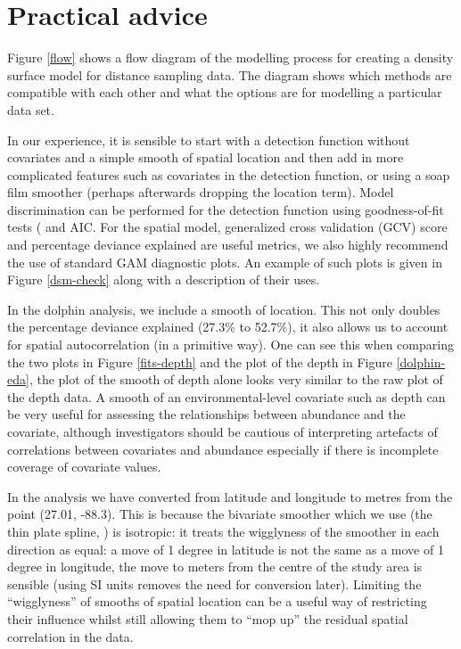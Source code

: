 \documentclass[a4paper,12pt]{article}
\begin{document}
\section*{Practical advice}
\label{s:practical}

Figure \ref{flow} shows a flow diagram of the modelling process for creating a density surface model for distance sampling data. The diagram shows which methods are compatible with each other and what the options are for modelling a particular data set.

In our experience, it is sensible to start with a detection function without covariates and a simple smooth of spatial location and then add in more complicated features such as covariates in the detection function, or using a soap film smoother (perhaps afterwards dropping the location term). Model discrimination can be performed for the detection function using goodness-of-fit tests (\cite{Buckland:2004ts} and AIC. For the spatial model, generalized cross validation (GCV) score and percentage deviance explained are useful metrics, we also highly recommend the use of standard GAM diagnostic plots. An example of such plots is given in Figure \ref{dsm-check} along with a description of their uses.

In the dolphin analysis, we include a smooth of location. This not only doubles the percentage deviance explained (27.3\% to 52.7\%), it also allows us to account for spatial autocorrelation (in a primitive way). One can see this when comparing the two plots in Figure \ref{fits-depth} and the plot of the depth in Figure \ref{dolphin-eda}, the plot of the smooth of depth alone looks very similar to the raw plot of the depth data. A smooth of an environmental-level covariate such as depth can be very useful for assessing the relationships between abundance and the covariate, although investigators should be cautious of interpreting artefacts of correlations between covariates and abundance especially if there is incomplete coverage of covariate values.

%

In the analysis we have converted from latitude and longitude to metres from the point (27.01, -88.3). This is because the bivariate smoother which we use (the thin plate spline, \cite{Wood:2003tc}) is isotropic: it treats the wigglyness of the smoother in each direction as equal: a move of 1 degree in latitude is not the same as a move of 1 degree in longitude, the move to meters from the centre of the study area is sensible (using SI units removes the need for conversion later). Limiting the ``wigglyness'' of smooths of spatial location can be a useful way of restricting their influence whilst still allowing them to ``mop up'' the residual spatial correlation in the data.
\end{document}
